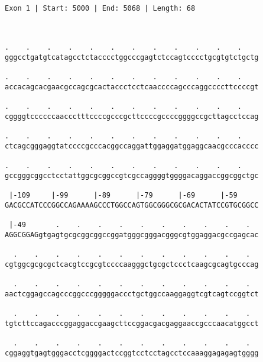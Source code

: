 \documentclass{article}
\begin{document}
 \begin{Verbatim}
 
Exon 1 | Start: 5000 | End: 5068 | Length: 68



.    .    .    .    .    .    .    .    .    .    .    .    
gggcctgatgtcatagcctctacccctggcccgagtctccagtcccctgcgtgtctgctg
                                                            
.    .    .    .    .    .    .    .    .    .    .    .    
accacagcacgaacgccagcgcactaccctcctcaaccccagcccaggccccttccccgt
                                                            
.    .    .    .    .    .    .    .    .    .    .    .    
cggggtccccccaaccctttccccgcccgcttccccgccccggggccgcttagcctccag
                                                            
.    .    .    .    .    .    .    .    .    .    .    .    
ctcagcgggaggtatccccgcccacggccaggattggaggatggaggcaacgcccacccc
                                                            
.    .    .    .    .    .    .    .    .    .    .    .    
gccgggcggcctcctattggcgcggccgtcgccaggggtggggacaggaccggcggctgc
                                                            
 |-109     |-99      |-89      |-79      |-69      |-59     
GACGCCATCCCGGCCAGAAAAGCCCTGGCCAGTGGCGGGCGCGACACTATCCGTGCGGCC
                                                            
 |-49       .    .    .    .    .    .    .    .    .    .  
AGGCGGAGgtgagtgcgcggcggccggatgggcgggacgggcgtggaggacgccgagcac
                                                            
  .    .    .    .    .    .    .    .    .    .    .    .  
cgtggcgcgcgctcacgtccgcgtccccaagggctgcgctccctcaagcgcagtgcccag
                                                            
  .    .    .    .    .    .    .    .    .    .    .    .  
aactcggagccagcccggcccgggggaccctgctggccaaggaggtcgtcagtccggtct
                                                            
  .    .    .    .    .    .    .    .    .    .    .    .  
tgtcttccagacccggaggaccgaagcttccggacgacgaggaaccgcccaacatggcct
                                                            
  .    .    .    .    .    .    .    .    .    .    .    .  
cggaggtgagtgggacctcggggactccggtcctcctagcctccaaaggagagagtgggg
                                                            

\end{Verbatim}
\end{document}
